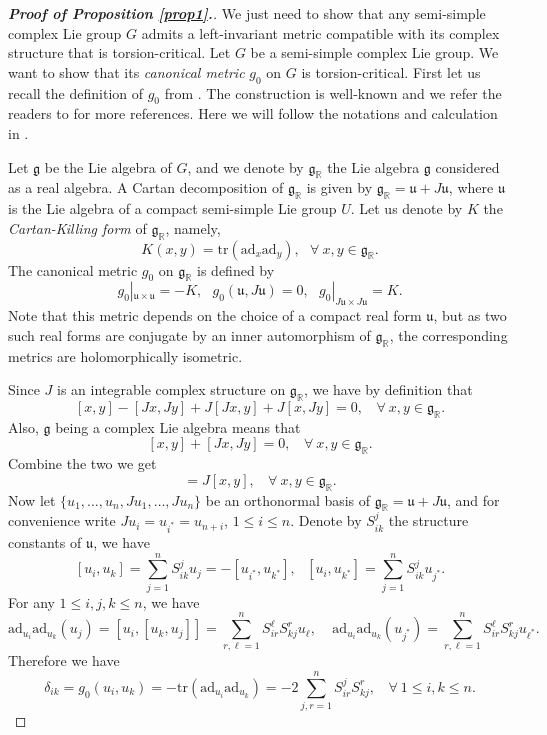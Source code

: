 \documentclass[10pt,a4paper]{amsart}
\theoremstyle{plain}
\theoremstyle{remark}
\begin{document}
\begin{proof}[{\bf Proof of Proposition \ref{prop1}.}]
We just need to show that any semi-simple complex Lie group $G$ admits a left-invariant metric compatible with its complex structure that is torsion-critical. Let $G$ be a  semi-simple complex Lie group. We want to show that its {\em canonical metric} $g_0$ on $G$ is torsion-critical. First let us  recall the definition of $g_0$ from \cite{PodestaZ}. The construction is well-known and we refer the readers to \cite{Gordon, Helgason, Lafuente} for more references. Here we will follow the notations and calculation in \cite{PodestaZ}.

Let ${\mathfrak g}$ be the Lie algebra of $G$, and we  denote by $\mathfrak g_{\mathbb R}$ the Lie algebra $\mathfrak g$ considered as a real algebra. A Cartan decomposition of  $\mathfrak g_{\mathbb R}$ is given by ${\mathfrak g_{\mathbb R}} = {\mathfrak u} + J{\mathfrak u}$, where ${\mathfrak u}$ is the Lie algebra of a compact semi-simple Lie group $U$. Let us denote by $K$ the {\em Cartan-Killing form} of ${\mathfrak g_{\mathbb R}}$, namely, 
$$ K(x,y) = \mbox{tr}(\mbox{ad}_x\mbox{ad}_y), \ \ \ \forall \ x,y \in {\mathfrak g_{\mathbb R}}. $$
The canonical metric $g_0$ on ${\mathfrak g_{\mathbb R}}$ is defined by
$$g_0|_{{\mathfrak u} \times {\mathfrak u}} = -K,\ \ \ g_0({\mathfrak u},J{\mathfrak u})=0,\ \ \ g_0|_{J{\mathfrak u} \times J{\mathfrak u}} = K.$$
Note that this metric depends on the choice of a compact real form ${\mathfrak u}$, but as two such real forms are conjugate by an inner automorphism of $\mathfrak g_{\mathbb R}$, the corresponding metrics are holomorphically isometric. 

Since $J$ is an integrable complex structure on ${\mathfrak g_{\mathbb R}}$, we have by definition that
$$ [x,y]-[Jx,Jy] + J[Jx,y] + J[x,Jy] = 0, \ \ \ \ \forall \ x,y \in {\mathfrak g_{\mathbb R}}. $$
Also,  ${\mathfrak g}$ being a complex Lie algebra means that 
$$ [x,y] + [Jx,Jy] = 0,  \ \ \ \ \forall \ x,y \in {\mathfrak g_{\mathbb R}}. $$
Combine the two we get
\begin{equation*}
[Jx,y]=J[x,y], \ \ \ \ \forall \ x,y \in {\mathfrak g}_{\mathbb R}. 
\end{equation*}
Now let $\{ u_1, \ldots , u_n, Ju_1, \ldots , Ju_n\}$ be an orthonormal basis of ${\mathfrak g}_{\mathbb R} = {\mathfrak u}+ J{\mathfrak u}$, and for convenience write $Ju_i=u_{i^{\ast}}=u_{n+i}$, $1\leq i\leq n$. 
Denote by $S^j_{ik}$ the structure constants of ${\mathfrak u}$, we have
$$ [u_i,u_k] =\sum_{j=1}^n S^j_{ik} u_j = - [u_{i^{\ast}}, u_{k^{\ast}}], \ \ \ [u_i, u_{k^{\ast}}] = \sum_{j=1}^n S^j_{ik}u_{j^{\ast}}. $$
For any $1\leq i,j,k \leq n$, we have
$$ \mbox{ad}_{u_i}\mbox{ad}_{u_k}(u_j) = [u_i, [u_k, u_j]] = \sum_{r,\ell =1}^n  S^{\ell}_{ir} S^r_{kj} u_{\ell}, \ \ \ \ \ \mbox{ad}_{u_i} \mbox{ad}_{u_k}(u_{j^{\ast}}) = \sum_{r,\ell =1}^n  S^{\ell}_{ir} S^r_{kj} u_{\ell^{\ast}}. $$
Therefore we have 
\begin{equation} \label{eq:SS}
\delta_{ik}=g_0(u_i,u_k) = - \mbox{tr}(\mbox{ad}_{u_i}\mbox{ad}_{u_k}) = -2 \sum_{j,r=1}^n  S^{j}_{ir} S^r_{kj}, \
 \ \ \ \forall \ 1\leq i,k\leq n.
\end{equation}


\end{proof}
\end{document}
